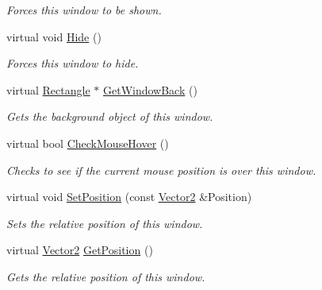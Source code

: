 \begin{DoxyCompactItemize}
\begin{DoxyCompactList}\small\item\em Forces this window to be shown. \item\end{DoxyCompactList}\item 
\hypertarget{classphys_1_1UI_1_1Window_a5eb51c6e1b2c440b52196fcf1022285e}{
virtual void \hyperlink{classphys_1_1UI_1_1Window_a5eb51c6e1b2c440b52196fcf1022285e}{Hide} ()}
\label{classphys_1_1UI_1_1Window_a5eb51c6e1b2c440b52196fcf1022285e}

\begin{DoxyCompactList}\small\item\em Forces this window to hide. \item\end{DoxyCompactList}\item 
virtual \hyperlink{classphys_1_1UI_1_1Rectangle}{Rectangle} $\ast$ \hyperlink{classphys_1_1UI_1_1Window_af06ae5666145e4d8835b38f4a9cbca2a}{GetWindowBack} ()
\begin{DoxyCompactList}\small\item\em Gets the background object of this window. \item\end{DoxyCompactList}\item 
virtual bool \hyperlink{classphys_1_1UI_1_1Window_a771bc9e43c0492ab179d8126c30665cf}{CheckMouseHover} ()
\begin{DoxyCompactList}\small\item\em Checks to see if the current mouse position is over this window. \item\end{DoxyCompactList}\item 
virtual void \hyperlink{classphys_1_1UI_1_1Window_a17e6284d4ac5aa95f257c5168d6cc5ac}{SetPosition} (const \hyperlink{classphys_1_1Vector2}{Vector2} \&Position)
\begin{DoxyCompactList}\small\item\em Sets the relative position of this window. \item\end{DoxyCompactList}\item 
virtual \hyperlink{classphys_1_1Vector2}{Vector2} \hyperlink{classphys_1_1UI_1_1Window_a29fca96d9a2dab29d77a36d6a329f306}{GetPosition} ()
\begin{DoxyCompactList}\small\item\em Gets the relative position of this window. \item\end{DoxyCompactList}\item 

\end{DoxyCompactItemize}
